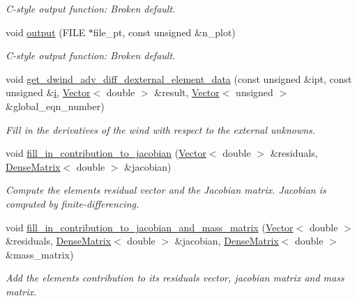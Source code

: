 \begin{DoxyCompactItemize}
\begin{DoxyCompactList}\small\item\em C-\/style output function\+: Broken default. \end{DoxyCompactList}\item 
void \hyperlink{classoomph_1_1AdvectionDiffusionBoussinesqElement_adbe60877f205b36d76a87695afb28caa}{output} (F\+I\+LE $\ast$file\+\_\+pt, const unsigned \&n\+\_\+plot)
\begin{DoxyCompactList}\small\item\em C-\/style output function\+: Broken default. \end{DoxyCompactList}\item 
void \hyperlink{classoomph_1_1AdvectionDiffusionBoussinesqElement_a89ea74af5d011a3866999c3760621edf}{get\+\_\+dwind\+\_\+adv\+\_\+diff\+\_\+dexternal\+\_\+element\+\_\+data} (const unsigned \&ipt, const unsigned \&\hyperlink{cfortran_8h_adb50e893b86b3e55e751a42eab3cba82}{i}, \hyperlink{classoomph_1_1Vector}{Vector}$<$ double $>$ \&result, \hyperlink{classoomph_1_1Vector}{Vector}$<$ unsigned $>$ \&global\+\_\+eqn\+\_\+number)
\begin{DoxyCompactList}\small\item\em Fill in the derivatives of the wind with respect to the external unknowns. \end{DoxyCompactList}\item 
void \hyperlink{classoomph_1_1AdvectionDiffusionBoussinesqElement_afc63db5ad4e397df7809447ee3ca56ac}{fill\+\_\+in\+\_\+contribution\+\_\+to\+\_\+jacobian} (\hyperlink{classoomph_1_1Vector}{Vector}$<$ double $>$ \&residuals, \hyperlink{classoomph_1_1DenseMatrix}{Dense\+Matrix}$<$ double $>$ \&jacobian)
\begin{DoxyCompactList}\small\item\em Compute the element\textquotesingle{}s residual vector and the Jacobian matrix. Jacobian is computed by finite-\/differencing. \end{DoxyCompactList}\item 
void \hyperlink{classoomph_1_1AdvectionDiffusionBoussinesqElement_a375fb98e225dbd5ac716ed3f68831069}{fill\+\_\+in\+\_\+contribution\+\_\+to\+\_\+jacobian\+\_\+and\+\_\+mass\+\_\+matrix} (\hyperlink{classoomph_1_1Vector}{Vector}$<$ double $>$ \&residuals, \hyperlink{classoomph_1_1DenseMatrix}{Dense\+Matrix}$<$ double $>$ \&jacobian, \hyperlink{classoomph_1_1DenseMatrix}{Dense\+Matrix}$<$ double $>$ \&mass\+\_\+matrix)
\begin{DoxyCompactList}\small\item\em Add the element\textquotesingle{}s contribution to its residuals vector, jacobian matrix and mass matrix. \end{DoxyCompactList}\item 

\end{DoxyCompactItemize}
